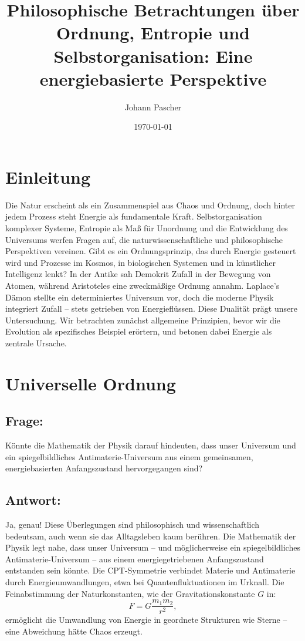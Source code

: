 \documentclass{article}
\title{Philosophische Betrachtungen über Ordnung, Entropie und Selbstorganisation: Eine energiebasierte Perspektive}
\author{Johann Pascher}
\date{\today}
\begin{document}
	
	\maketitle
	\tableofcontents

	
	\section{Einleitung}
	Die Natur erscheint als ein Zusammenspiel aus Chaos und Ordnung, doch hinter jedem Prozess steht Energie als fundamentale Kraft. Selbstorganisation komplexer Systeme, Entropie als Maß für Unordnung und die Entwicklung des Universums werfen Fragen auf, die naturwissenschaftliche und philosophische Perspektiven vereinen. Gibt es ein Ordnungsprinzip, das durch Energie gesteuert wird und Prozesse im Kosmos, in biologischen Systemen und in künstlicher Intelligenz lenkt? In der Antike sah Demokrit Zufall in der Bewegung von Atomen, während Aristoteles eine zweckmäßige Ordnung annahm. Laplace’s Dämon stellte ein determiniertes Universum vor, doch die moderne Physik integriert Zufall – stets getrieben von Energieflüssen. Diese Dualität prägt unsere Untersuchung. Wir betrachten zunächst allgemeine Prinzipien, bevor wir die Evolution als spezifisches Beispiel erörtern, und betonen dabei Energie als zentrale Ursache.
	
	\section{Universelle Ordnung}
	
	\subsection*{Frage:}
	Könnte die Mathematik der Physik darauf hindeuten, dass unser Universum und ein spiegelbildliches Antimaterie-Universum aus einem gemeinsamen, energiebasierten Anfangszustand hervorgegangen sind?
	
	\subsection*{Antwort:}
	Ja, genau! Diese Überlegungen sind philosophisch und wissenschaftlich bedeutsam, auch wenn sie das Alltagsleben kaum berühren. Die Mathematik der Physik legt nahe, dass unser Universum – und möglicherweise ein spiegelbildliches Antimaterie-Universum – aus einem energiegetriebenen Anfangszustand entstanden sein könnte. Die CPT-Symmetrie verbindet Materie und Antimaterie durch Energieumwandlungen, etwa bei Quantenfluktuationen im Urknall. Die Feinabstimmung der Naturkonstanten, wie der Gravitationskonstante $G$ in:
	\begin{equation}
		F = G \frac{m_1 m_2}{r^2},
	\end{equation}
	ermöglicht die Umwandlung von Energie in geordnete Strukturen wie Sterne – eine Abweichung hätte Chaos erzeugt.
	
\end{document}
